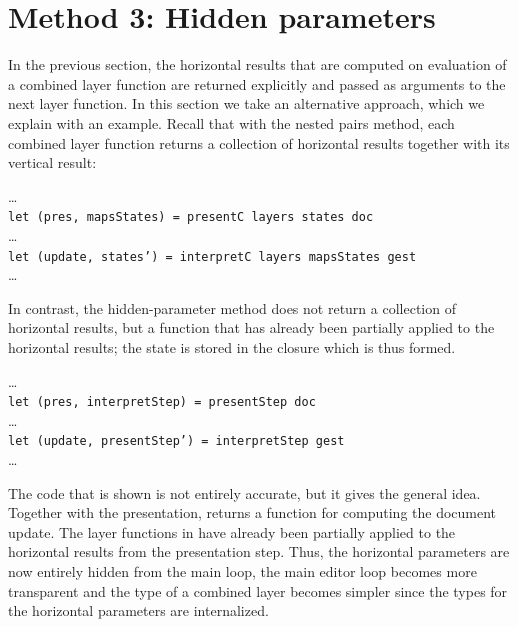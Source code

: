 \documentclass[preprint,natbib]{sigplanconf}
\begin{document}
%																
%																
%																
\section{Method 3: Hidden parameters} \label{sect:hidden}

 
In the previous section, the horizontal results that are computed on evaluation of a combined layer function are returned explicitly and passed as arguments to the next layer function. In this section we take an alternative approach, which we explain with an example.  Recall that with the nested pairs method, each combined layer function returns a collection of horizontal results together with its vertical result:

\noindent
\dots\\
{\small \tt  let (pres, mapsStates) = presentC layers states doc }\\
\dots\\
{\small \tt let (update, states') = interpretC layers mapsStates gest}\\
\dots

In contrast, the hidden-parameter method does not return a collection of horizontal results, but a function that has already been partially applied to the horizontal results; the state is stored in the closure which is thus formed.

\noindent
\dots\\
{\small \tt let (pres, interpretStep) = presentStep doc}\\
\dots\\
{\small \tt let (update, presentStep') = interpretStep gest}\\
\dots

The code that is shown is not entirely accurate, but it gives the general idea. Together with the presentation,  returns a function  for computing the document update. The layer functions in  have already been partially applied to the horizontal results from the presentation step. Thus, the horizontal parameters are now entirely hidden from the main loop, the main editor loop becomes more transparent and the type of a combined layer becomes simpler since the types for the horizontal parameters are internalized.


\end{document}
